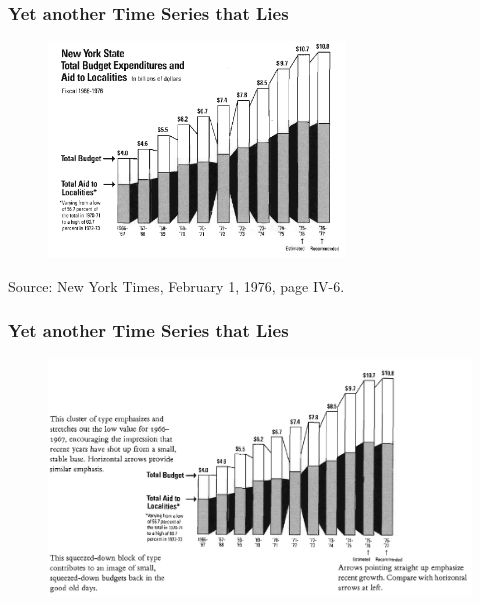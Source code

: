 \documentclass[notes, aspectratio=1610]{beamer}
\begin{document}
\begin{frame}
	\frametitle{Yet another Time Series that Lies}
	\begin{figure}
		\begin{small}
			\begin{center}
				\includegraphics[width=0.7\textwidth]{
					images/nys_budget.png
					}
			\end{center}
		\end{small}
	\end{figure}

	\footnotesize
	Source: New York Times, February 1, 1976, page IV-6.
\end{frame}

\begin{frame}
	\frametitle{Yet another Time Series that Lies}
	\begin{figure}
		\begin{small}
			\begin{center}
				\includegraphics[width=1\textwidth]{
					images/errors.png
					}
			\end{center}
		\end{small}
	\end{figure}
\end{frame}
\end{document}
